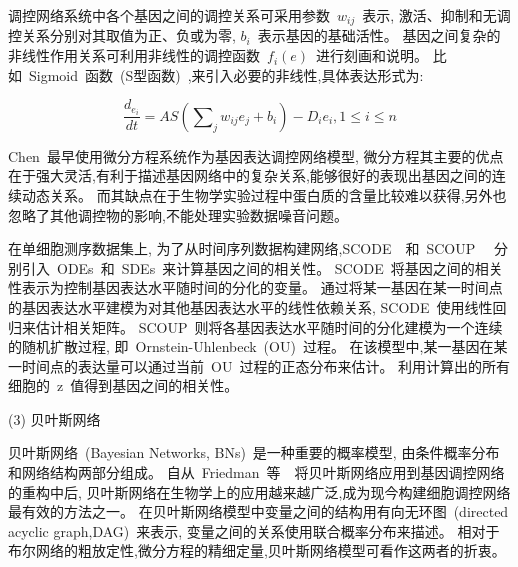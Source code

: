 调控网络系统中各个基因之间的调控关系可采用参数~$w_{ij}$~表示,
激活、抑制和无调控关系分别对其取值为正、负或为零, $b_i$~表示基因的基础活性。
基因之间复杂的非线性作用关系可利用非线性的调控函数~$f_i(e)$~进行刻画和说明。
比如~Sigmoid~函数~(S型函数)~,来引入必要的非线性,具体表达形式为:

\begin{equation}
\frac{{d_{e_i } }}{{dt}} = AS(\sum\nolimits_j {w_{ij} e_j } + b_i) - D_i e_i ,1 \le i \le n
\end{equation}

Chen~\cite{chen1999modeling}最早使用微分方程系统作为基因表达调控网络模型,
微分方程其主要的优点在于强大灵活,有利于描述基因网络中的复杂关系,能够很好的表现出基因之间的连续动态关系。
而其缺点在于生物学实验过程中蛋白质的含量比较难以获得,另外也忽略了其他调控物的影响,不能处理实验数据噪音问题。

在单细胞测序数据集上, 
为了从时间序列数据构建网络,SCODE~\cite{matsumoto2017scode}~和~SCOUP~\cite{matsumoto2016scoup}~
分别引入~ODEs~和~SDEs~来计算基因之间的相关性。
SCODE~将基因之间的相关性表示为控制基因表达水平随时间的分化的变量。
通过将某一基因在某一时间点的基因表达水平建模为对其他基因表达水平的线性依赖关系,
SCODE~使用线性回归来估计相关矩阵。
SCOUP~则将各基因表达水平随时间的分化建模为一个连续的随机扩散过程, 即~Ornstein-Uhlenbeck~(OU)~过程。
在该模型中,某一基因在某一时间点的表达量可以通过当前~OU~过程的正态分布来估计。
利用计算出的所有细胞的~z~值得到基因之间的相关性。

(3) 贝叶斯网络

贝叶斯网络~(Bayesian Networks, BNs)~是一种重要的概率模型,
由条件概率分布和网络结构两部分组成。
自从~Friedman~等~\cite{friedman2000using}~将贝叶斯网络应用到基因调控网络的重构中后,
贝叶斯网络在生物学上的应用越来越广泛,成为现今构建细胞调控网络最有效的方法之一。
在贝叶斯网络模型中变量之间的结构用有向无环图~(directed acyclic graph,DAG)~来表示,
变量之间的关系使用联合概率分布来描述。
相对于布尔网络的粗放定性,微分方程的精细定量,贝叶斯网络模型可看作这两者的折衷。

